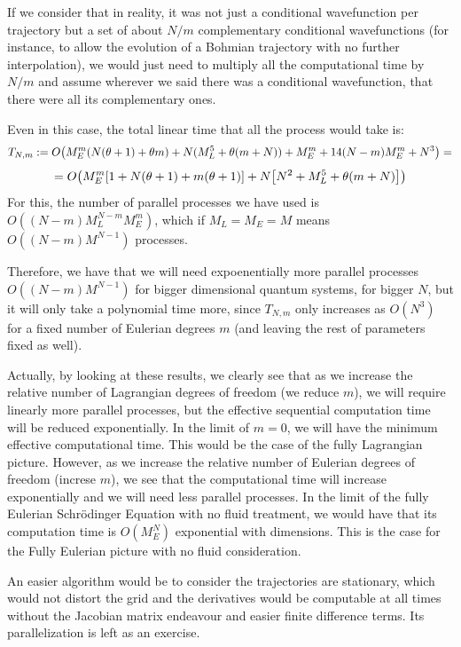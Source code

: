 \documentclass[11pt, a4paper]{article} %
\begin{document}
If we consider that in reality, it was not just a conditional wavefunction per trajectory but a set of about $N/m$ complementary conditional wavefunctions (for instance, to allow the evolution of a Bohmian trajectory with no further interpolation), we would just need to multiply all the computational time by $N/m$ and assume wherever we said there was a conditional wavefunction, that there were all its complementary ones.

Even in this case, the total linear time that all the process would take is:
\begin{equation}
T_{N,m}:=O\qty(M_E^m(N(\theta+1)+\theta m)+N(M_L^5+\theta(m+N))+M_E^m+14(N-m)M_E^m+N^3)=
\end{equation}
$$
=O\qty(M_E^m\qty[1+N(\theta+1)+m(\theta+1)]+N\qty[N^2+M_L^5+\theta(m+N) ])
$$
For this, the number of parallel processes we have used is $O((N-m)M_L^{N-m}M_E^{m})$, which if $M_L=M_E=M$ means $O((N-m)M^{N-1})$ processes.

Therefore, we have that we will need expoenentially more parallel processes $O((N-m)M^{N-1})$ for bigger dimensional quantum systems, for bigger $N$, but it will only take a polynomial time more, since $T_{N,m}$ only increases as $O(N^3)$ for a fixed number of Eulerian degrees $m$ (and leaving the rest of parameters fixed as well).

Actually, by looking at these results, we clearly see that as we increase the relative number of Lagrangian degrees of freedom (we reduce $m$), we will require linearly more parallel processes, but the effective sequential computation time will be reduced exponentially. In the limit of $m=0$, we will have the minimum effective computational time. This would be the case of the fully Lagrangian picture. However, as we increase the relative number of Eulerian degrees of freedom (increse $m$), we see that the computational time will increase exponentially and we will need less parallel processes. In the limit of the fully Eulerian Schrödinger Equation with no fluid treatment, we would have that its computation time is $O(M_E^N)$ exponential with dimensions. This is the case for the Fully Eulerian picture with no fluid consideration.

An easier algorithm would be to consider the trajectories are stationary, which would not distort the grid and the derivatives would be computable at all times without the Jacobian matrix endeavour and easier finite difference terms. Its parallelization is left as an exercise.
\end{document}

